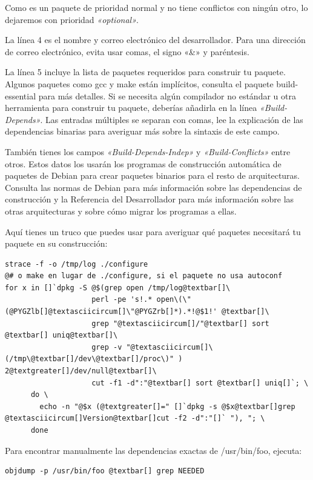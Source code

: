 \documentclass[letterpaper,12pt,spanish]{manual}
\begin{document}
Como es un paquete de prioridad normal y no tiene conflictos con ningún otro, lo dejaremos con prioridad \emph{«optional»}.

La línea 4 es el nombre y correo electrónico del desarrollador. Para una dirección de correo electrónico, evita usar comas, el signo «\&» y paréntesis.

La línea 5 incluye la lista de paquetes requeridos para construir tu paquete. Algunos paquetes como gcc y make están implícitos, consulta el paquete build-essential para más detalles. Si se necesita algún compilador no estándar u otra herramienta para construir tu paquete, deberías añadirla en la línea \emph{«Build-Depends»}. Las entradas múltiples se separan con comas, lee la explicación de las dependencias binarias para averiguar más sobre la sintaxis de este campo.

También tienes los campos \emph{«Build-Depends-Indep»} y \emph{«Build-Conflicts»} entre otros. Estos datos los usarán los programas de construcción automática de paquetes de Debian para crear paquetes binarios para el resto de arquitecturas. Consulta las normas de Debian para más información sobre las dependencias de construcción y la Referencia del Desarrollador para más información sobre las otras arquitecturas y sobre cómo migrar los programas a ellas.

Aquí tienes un truco que puedes usar para averiguar qué paquetes necesitará tu paquete en su construcción:

\begin{Verbatim}[commandchars=@\[\]]
strace -f -o /tmp/log ./configure
@# o make en lugar de ./configure, si el paquete no usa autoconf
for x in []`dpkg -S @$(grep open /tmp/log@textbar[]\
                    perl -pe 's!.* open\(\"(@PYGZlb[]@textasciicircum[]\"@PYGZrb[]*).*!@$1!' @textbar[]\
                    grep "@textasciicircum[]/"@textbar[] sort @textbar[] uniq@textbar[]\
                    grep -v "@textasciicircum[]\(/tmp\@textbar[]/dev\@textbar[]/proc\)" ) 2@textgreater[]/dev/null@textbar[]\
                    cut -f1 -d":"@textbar[] sort @textbar[] uniq[]`; \
      do \
        echo -n "@$x (@textgreater[]=" []`dpkg -s @$x@textbar[]grep @textasciicircum[]Version@textbar[]cut -f2 -d":"[]` "), "; \
      done
\end{Verbatim}

Para encontrar manualmente las dependencias exactas de /usr/bin/foo, ejecuta:

\begin{Verbatim}[commandchars=@\[\]]
objdump -p /usr/bin/foo @textbar[] grep NEEDED
\end{Verbatim}
\end{document}
